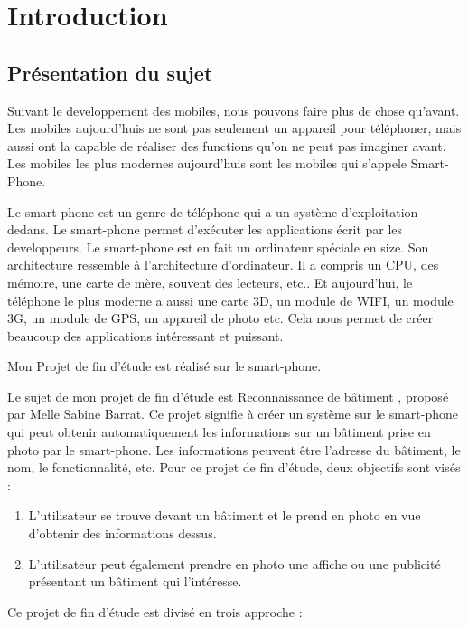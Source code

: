 ﻿\section{Introduction}

\subsection{Présentation du sujet} %
\label{sub:présentation_du_sujet}

Suivant le developpement des mobiles, nous pouvons faire plus de chose qu'avant. Les mobiles aujourd'huis ne sont pas seulement un appareil pour téléphoner, mais aussi ont la capable de réaliser des functions qu'on ne peut pas imaginer avant. Les mobiles les plus modernes aujourd'huis sont les mobiles qui s'appele Smart-Phone. 

Le smart-phone est un genre de téléphone qui a un système d'exploitation dedans. Le smart-phone permet d'exécuter les applications écrit par les developpeurs. Le smart-phone est en fait un ordinateur spéciale en size. Son architecture ressemble à l'architecture d'ordinateur. Il a compris un CPU, des mémoire, une carte de mère, souvent des lecteurs, etc.. Et aujourd'hui, le téléphone le plus moderne a aussi une carte 3D, un module de WIFI, un module 3G, un module de GPS, un appareil de photo etc. Cela nous permet de créer beaucoup des applications intéressant et puissant. 

Mon Projet de fin d'étude est réalisé sur le smart-phone. 

Le sujet de mon projet de fin d'étude est \guillemotleft Reconnaissance de bâtiment \guillemotright, proposé par Melle Sabine Barrat. Ce projet signifie à créer un système sur le smart-phone qui peut obtenir automatiquement les informations sur un bâtiment prise en photo par le smart-phone. Les informations peuvent être l'adresse du bâtiment, le nom, le fonctionnalité, etc. Pour ce projet de fin d'étude, deux objectifs sont visés : 
\begin{enumerate}
	\item L’utilisateur se trouve devant un bâtiment et le prend en photo en vue d’obtenir des informations dessus. 
	\item L’utilisateur peut également prendre en photo une affiche ou une publicité présentant un bâtiment qui l’intéresse.
\end{enumerate}

Ce projet de fin d'étude est divisé en trois approche :

